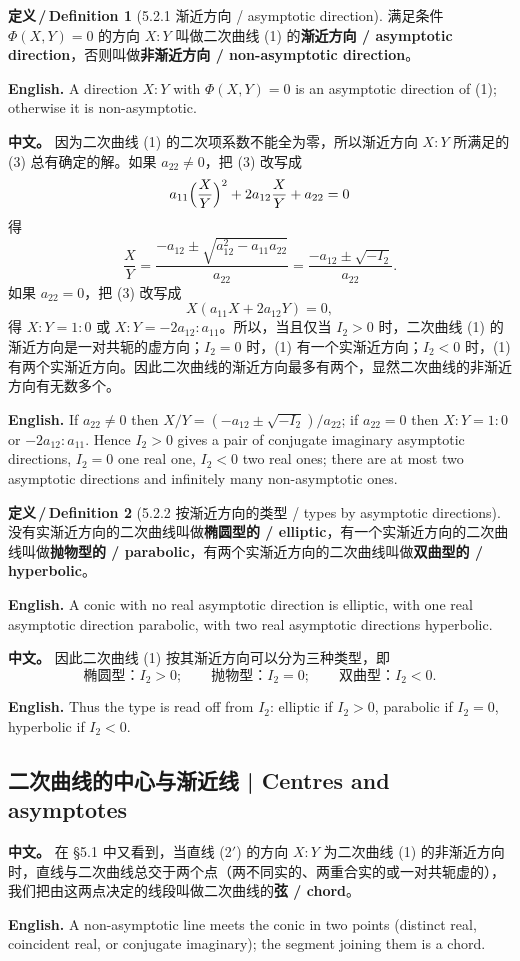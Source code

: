 \documentclass[UTF8,11pt,a4paper]{ctexart}
\newcommand{\APS}[2]{\par\noindent\textbf{中文。} #1\par\noindent\textbf{English.} #2\par\smallskip}
\newcommand{\EN}[1]{\par\noindent \textbf{English.} #1\par}
\theoremstyle{definition}
\newtheorem*{definition}{定义\,/\,Definition}
\begin{document}
\begin{definition}[5.2.1 渐近方向 / asymptotic direction]\label{def:asymdir}
满足条件 $\Phi(X,Y)=0$ 的方向 $X:Y$ 叫做二次曲线 (1) 的\textbf{渐近方向 / asymptotic direction}，否则叫做\textbf{非渐近方向 / non-asymptotic direction}。
\EN{A direction $X:Y$ with $\Phi(X,Y)=0$ is an asymptotic direction of (1); otherwise it is non-asymptotic.}
\end{definition}

\APS{因为二次曲线 (1) 的二次项系数不能全为零，所以渐近方向 $X:Y$ 所满足的 (3) 总有确定的解。如果 $a_{22}\ne0$，把 (3) 改写成
\[
a_{11}\Bigl(\frac{X}{Y}\Bigr)^2+2a_{12}\frac{X}{Y}+a_{22}=0
\]
得
\[
\frac{X}{Y}=\frac{-a_{12}\pm\sqrt{a_{12}^2-a_{11}a_{22}}}{a_{22}}=\frac{-a_{12}\pm\sqrt{-I_2}}{a_{22}}.
\]
如果 $a_{22}=0$，把 (3) 改写成
\[
X(a_{11}X+2a_{12}Y)=0,
\]
得 $X:Y=1:0$ 或 $X:Y=-2a_{12}:a_{11}$。所以，当且仅当 $I_2>0$ 时，二次曲线 (1) 的渐近方向是一对共轭的虚方向；$I_2=0$ 时，(1) 有一个实渐近方向；$I_2<0$ 时，(1) 有两个实渐近方向。因此二次曲线的渐近方向最多有两个，显然二次曲线的非渐近方向有无数多个。}{If $a_{22}\ne0$ then $X/Y=(-a_{12}\pm\sqrt{-I_2})/a_{22}$; if $a_{22}=0$ then $X:Y=1:0$ or $-2a_{12}:a_{11}$. Hence $I_2>0$ gives a pair of conjugate imaginary asymptotic directions, $I_2=0$ one real one, $I_2<0$ two real ones; there are at most two asymptotic directions and infinitely many non-asymptotic ones.}

\begin{definition}[5.2.2 按渐近方向的类型 / types by asymptotic directions]\label{def:conictype}
没有实渐近方向的二次曲线叫做\textbf{椭圆型的 / elliptic}，有一个实渐近方向的二次曲线叫做\textbf{抛物型的 / parabolic}，有两个实渐近方向的二次曲线叫做\textbf{双曲型的 / hyperbolic}。
\EN{A conic with no real asymptotic direction is elliptic, with one real asymptotic direction parabolic, with two real asymptotic directions hyperbolic.}
\end{definition}

\APS{因此二次曲线 (1) 按其渐近方向可以分为三种类型，即
\[
\text{椭圆型：}I_2>0;\qquad \text{抛物型：}I_2=0;\qquad \text{双曲型：}I_2<0.
\]}{Thus the type is read off from $I_2$: elliptic if $I_2>0$, parabolic if $I_2=0$, hyperbolic if $I_2<0$.}

\subsection{二次曲线的中心与渐近线 | Centres and asymptotes}
\APS{在 §5.1 中又看到，当直线 (2$'$) 的方向 $X:Y$ 为二次曲线 (1) 的非渐近方向时，直线与二次曲线总交于两个点（两不同实的、两重合实的或一对共轭虚的），我们把由这两点决定的线段叫做二次曲线的\textbf{弦 / chord}。}{A non-asymptotic line meets the conic in two points (distinct real, coincident real, or conjugate imaginary); the segment joining them is a chord.}
\end{document}
